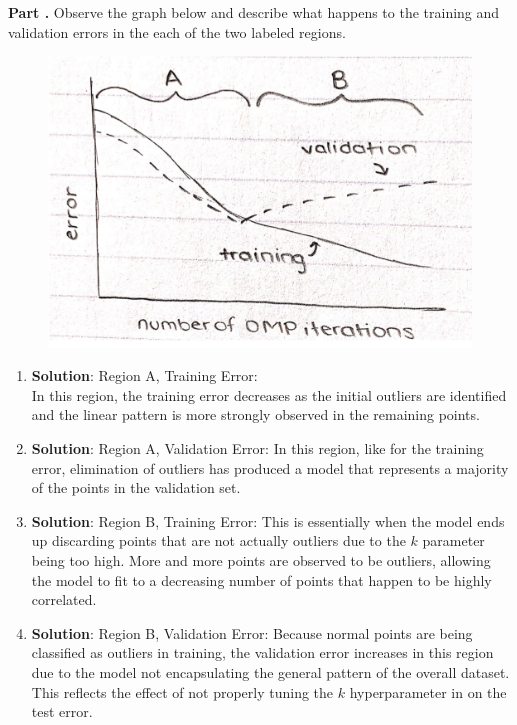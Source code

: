 \documentclass[11pt,letterpaper]{article}
\newcounter{problem}
\newcommand{\problem}{
	\stepcounter{problem}%
	\noindent \textbf{Part \theproblem. }%
}
\begin{document}
\vspace{1cm}

\problem Observe the graph below and describe what happens to the training and validation errors in the each of the two labeled regions.
\begin{figure}[!h]
  \centering
  \includegraphics[scale=0.3]{graph}
\end{figure}
    \begin{enumerate}
        \item \textbf{Solution}: Region A, Training Error: \\
            In this region, the training error decreases as the initial outliers are identified and the linear pattern is more strongly observed in the remaining points. 
        \item \textbf{Solution}: Region A, Validation Error:
            In this region, like for the training error, elimination of outliers has produced a model that represents a majority of the points in the validation set. 
        \item \textbf{Solution}: Region B, Training Error:
            This is essentially when the model ends up discarding points that are not actually outliers due to the $k$ parameter being too high. More and more points are observed to be outliers, allowing the model to fit to a decreasing number of points that happen to be highly correlated.
        \item \textbf{Solution}: Region B, Validation Error:
            Because normal points are being classified as outliers in training, the validation error increases in this region due to the model not encapsulating the general pattern of the overall dataset. This reflects the effect of not properly tuning the $k$ hyperparameter in on the test error.
    \end{enumerate}
\end{document}
